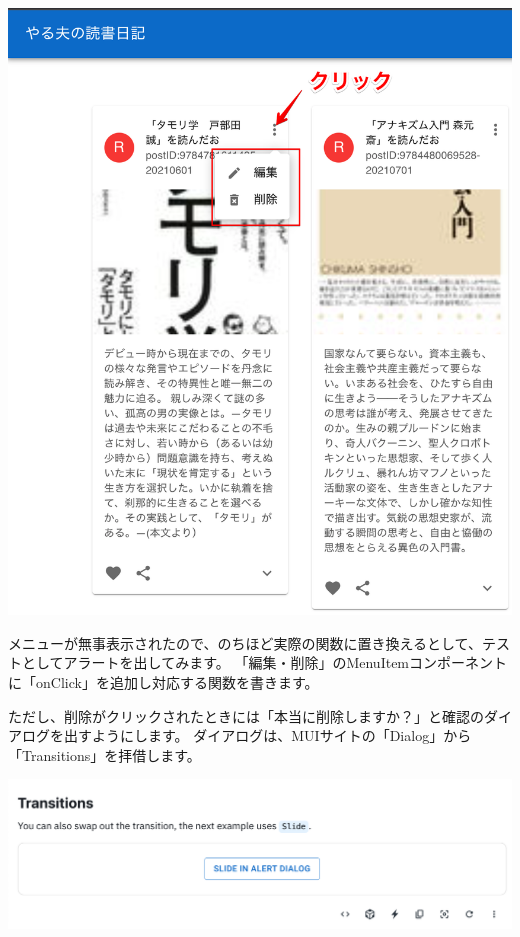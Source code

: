 \clearpage

\begin{reviewimage}%
\includegraphics[width=0.7\maxwidth]{./images/03-todo-with-react/mui012-card-MenuStep1.png}%
\label{image:03-todo-with-react:mui012-card-MenuStep1}
\end{reviewimage}

メニューが無事表示されたので、のちほど実際の関数に置き換えるとして、テストとしてアラートを出してみます。
「編集・削除」のMenuItemコンポーネントに「onClick」を追加し対応する関数を書きます。

\vspace*{\baselineskip}

ただし、削除がクリックされたときには「本当に削除しますか？」と確認のダイアログを出すようにします。
ダイアログは、MUIサイトの「Dialog」から「Transitions」を拝借します。

\begin{reviewimage}[H]%
\includegraphics[width=0.6\maxwidth]{./images/03-todo-with-react/mui013-card-deleteDialog.png}%
\label{image:03-todo-with-react:mui013-card-deleteDialog}
\end{reviewimage}
\vspace*{\baselineskip}

